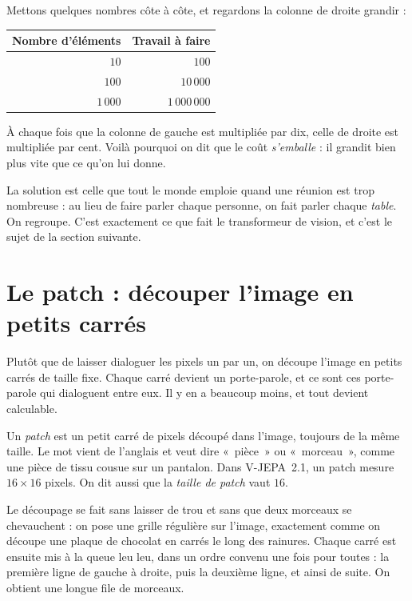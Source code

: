 \begin{exemple}
Mettons quelques nombres côte à côte, et regardons la colonne de droite
grandir :

\begin{center}
\footnotesize
\begin{tabular}{rr}
\toprule
\textbf{Nombre d'éléments} & \textbf{Travail à faire} \\
\midrule
$10$    & $100$ \\
$100$   & $10\,000$ \\
$1\,000$ & $1\,000\,000$ \\
\bottomrule
\end{tabular}
\end{center}

À chaque fois que la colonne de gauche est multipliée par dix, celle de
droite est multipliée par cent. Voilà pourquoi on dit que le coût
\emph{s'emballe} : il grandit bien plus vite que ce qu'on lui donne.
\end{exemple}

La solution est celle que tout le monde emploie quand une réunion est trop
nombreuse : au lieu de faire parler chaque personne, on fait parler chaque
\emph{table}. On regroupe. C'est exactement ce que fait le transformeur de
vision, et c'est le sujet de la section suivante.

\section{Le patch : découper l'image en petits carrés}

\begin{enclair}
Plutôt que de laisser dialoguer les pixels un par un, on découpe l'image en
petits carrés de taille fixe. Chaque carré devient un porte-parole, et ce
sont ces porte-parole qui dialoguent entre eux. Il y en a beaucoup moins, et
tout devient calculable.
\end{enclair}

\begin{definition}[Le patch][patch]
Un \emph{patch} est un petit carré de pixels découpé dans l'image, toujours
de la même taille. Le mot vient de l'anglais et veut dire «~pièce~» ou
«~morceau~», comme une pièce de tissu cousue sur un pantalon. Dans
V-JEPA~2.1, un patch mesure $16 \times 16$ pixels. On dit aussi que la
\emph{taille de patch} vaut $16$.
\end{definition}

Le découpage se fait sans laisser de trou et sans que deux morceaux se
chevauchent : on pose une grille régulière sur l'image, exactement comme on
découpe une plaque de chocolat en carrés le long des rainures. Chaque carré
est ensuite mis à la queue leu leu, dans un ordre convenu une fois pour
toutes : la première ligne de gauche à droite, puis la deuxième ligne, et
ainsi de suite. On obtient une longue file de morceaux.

